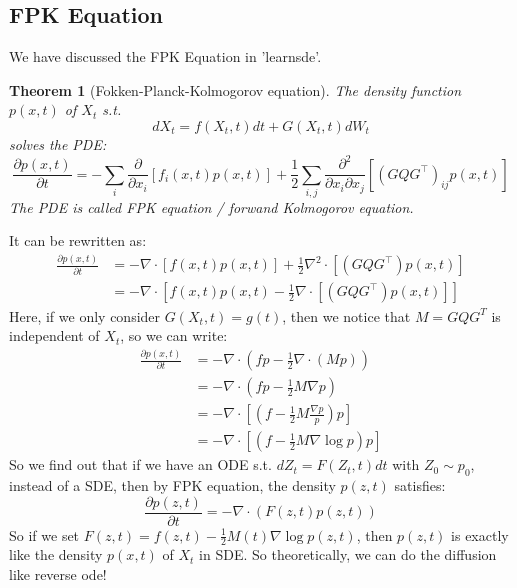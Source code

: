 \documentclass{article}
\newtheorem{theorem}{Theorem}
\begin{document}
\subsection{FPK Equation}
We have discussed the FPK Equation in 'learnsde'. 
\begin{theorem}[Fokken-Planck-Kolmogorov equation]
    The density function $p(x, t)$ of $X_t$ s.t. 
    \begin{equation}
        dX_t = f(X_t, t)dt + G(X_t,t)dW_t
    \end{equation}
    solves the PDE:
    \begin{equation}
        \frac{\partial p(x, t)}{\partial t}=-\sum_{i} \frac{\partial}{\partial x_{i}}\left[f_{i}(x, t) p(x, t)\right]+\frac{1}{2} \sum_{i, j} \frac{\partial^{2}}{\partial x_{i} \partial x_{j}}\left[\left(G Q G^{\top}\right)_{i j} p(x, t)\right]
    \end{equation}
    The PDE is called FPK equation / forwand Kolmogorov equation.
\end{theorem}
It can be rewritten as:
\begin{equation}
    \begin{aligned}
        \frac{\partial p(x, t)}{\partial t} &= -\nabla\cdot\left[f(x, t) p(x, t)\right]+\frac{1}{2} \nabla^2\cdot\left[\left(G Q G^{\top}\right) p(x, t)\right] \\
        &=-\nabla\cdot\left[f(x, t) p(x, t)-\frac{1}{2} \nabla\cdot\left[\left(G Q G^{\top}\right) p(x, t)\right]\right]
    \end{aligned}
\end{equation}
Here, if we only consider $G(X_t, t)=g(t)$, then we notice that $M=GQG^T$ is independent of $X_t$, so we can write:
\begin{equation}
    \begin{aligned}
        \frac{\partial p(x, t)}{\partial t} &= -\nabla\cdot\left(fp-\frac{1}{2}\nabla\cdot (Mp)\right)\\
        &=-\nabla\cdot\left(fp-\frac{1}{2}M\nabla p\right)\\
        &=-\nabla\cdot\left[\left(f-\frac{1}{2}M\frac{\nabla p}{p}\right)p\right]\\
        &=-\nabla\cdot\left[\left(f-\frac{1}{2}M\nabla\log p\right)p\right]
    \end{aligned}
\end{equation}
So we find out that if we have an ODE s.t. $dZ_t=F(Z_t, t)dt$ with $Z_0 \sim p_0$, instead of a SDE, then by FPK equation, the density $p(z, t)$ satisfies:
\begin{equation}
    \frac{\partial p(z, t)}{\partial t}=-\nabla\cdot\left(F(z, t)p(z, t)\right)
\end{equation}
So if we set $F(z, t)=f(z, t) - \frac{1}{2}M(t)\nabla\log p(z, t)$, then $p(z, t)$ is exactly like the density $p(x, t)$ of $X_t$ in SDE. 
So theoretically, we can do the diffusion like reverse ode!
\end{document}
